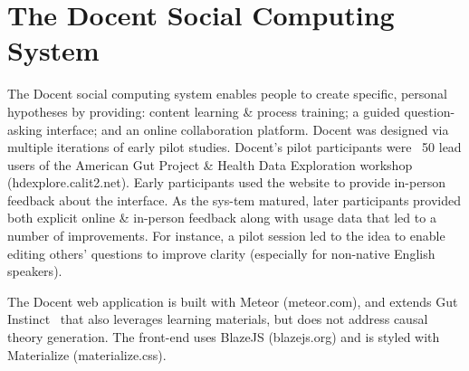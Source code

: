 \section{The Docent Social Computing System}
The Docent social computing system enables people to create specific, personal hypotheses by providing: content learning \& process training; a guided question-asking interface; and an online collaboration platform. Docent was designed via multiple iterations of early pilot studies. Docent’s pilot participants were ~50 lead users of the American Gut Project \& Health Data Exploration workshop (hdexplore.calit2.net). Early participants used the website to provide in-person feedback about the interface. As the sys-tem matured, later participants provided both explicit online \& in-person feedback along with usage data that led to a number of improvements. For instance, a pilot session led to the idea to enable editing others’ questions to improve clarity (especially for non-native English speakers).

The Docent web application is built with Meteor (meteor.com), and extends Gut Instinct~\cite{Pandey2017} that also leverages learning materials, but does not address causal theory generation. The front-end uses BlazeJS (blazejs.org) and is styled with Materialize (materialize.css).

